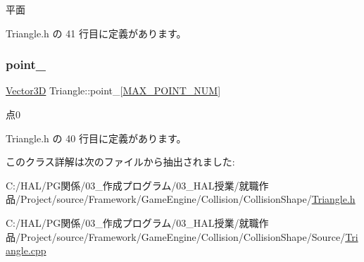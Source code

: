 平面 



 Triangle.\+h の 41 行目に定義があります。

\mbox{\label{class_triangle_a0ade12967df7d4c69d4b3841e59fd3c0}} 
\subsubsection{\texorpdfstring{point\+\_\+}{point\_}}
{\footnotesize\ttfamily \mbox{\hyperlink{class_vector3_d}{Vector3D}} Triangle\+::point\+\_\+\mbox{[}\mbox{\hyperlink{class_triangle_aa79a559da8bd7104052922b6c8c40287}{M\+A\+X\+\_\+\+P\+O\+I\+N\+T\+\_\+\+N\+UM}}\mbox{]}\hspace{0.3cm}{\ttfamily [private]}}



点0 



 Triangle.\+h の 40 行目に定義があります。



このクラス詳解は次のファイルから抽出されました\+:\begin{DoxyCompactItemize}
\item 
C\+:/\+H\+A\+L/\+P\+G関係/03\+\_\+作成プログラム/03\+\_\+\+H\+A\+L授業/就職作品/\+Project/source/\+Framework/\+Game\+Engine/\+Collision/\+Collision\+Shape/\mbox{\hyperlink{_triangle_8h}{Triangle.\+h}}\item 
C\+:/\+H\+A\+L/\+P\+G関係/03\+\_\+作成プログラム/03\+\_\+\+H\+A\+L授業/就職作品/\+Project/source/\+Framework/\+Game\+Engine/\+Collision/\+Collision\+Shape/\+Source/\mbox{\hyperlink{_triangle_8cpp}{Triangle.\+cpp}}\end{DoxyCompactItemize}
